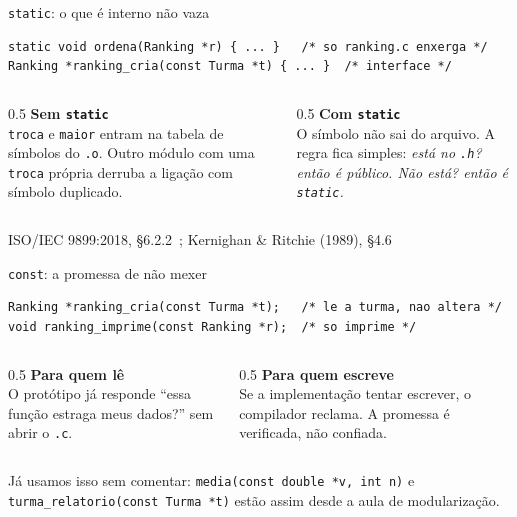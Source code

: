 \documentclass[aspectratio=169]{beamer}
\newcommand{\fonte}[1]{\vfill\hfill{\scriptsize\textcolor{UFSGray}{#1}}}
\begin{document}
\begin{frame}[fragile]{\texttt{static}: o que é interno não vaza}
\begin{lstlisting}[style=tinyC]
static void ordena(Ranking *r) { ... }   /* so ranking.c enxerga */
Ranking *ranking_cria(const Turma *t) { ... }  /* interface */
\end{lstlisting}
  \begin{columns}[T]
    \begin{column}{0.5\textwidth}
      \small \textbf{Sem \texttt{static}}\\
      \texttt{troca} e \texttt{maior} entram na tabela de símbolos do
      \texttt{.o}. Outro módulo com uma \texttt{troca} própria derruba a
      ligação com símbolo duplicado.
    \end{column}
    \begin{column}{0.5\textwidth}
      \small \textbf{Com \texttt{static}}\\
      O símbolo não sai do arquivo. A regra fica simples: \emph{está no
      \texttt{.h}? então é público. Não está? então é \texttt{static}.}
    \end{column}
  \end{columns}
  \fonte{ISO/IEC 9899:2018, §6.2.2~\cite{iso2018c17}; Kernighan \& Ritchie (1989), §4.6~\cite{kernighan1989c}}
\end{frame}

\begin{frame}[fragile]{\texttt{const}: a promessa de não mexer}
\begin{lstlisting}[style=tinyC]
Ranking *ranking_cria(const Turma *t);   /* le a turma, nao altera */
void ranking_imprime(const Ranking *r);  /* so imprime */
\end{lstlisting}
  \begin{columns}[T]
    \begin{column}{0.5\textwidth}
      \small \textbf{Para quem lê}\\
      O protótipo já responde ``essa função estraga meus dados?'' sem abrir
      o \texttt{.c}.
    \end{column}
    \begin{column}{0.5\textwidth}
      \small \textbf{Para quem escreve}\\
      Se a implementação tentar escrever, o compilador reclama. A promessa
      é verificada, não confiada.
    \end{column}
  \end{columns}
  \begin{block}{}
    \small Já usamos isso sem comentar: \texttt{media(const double *v, int n)}
    e \texttt{turma\_relatorio(const Turma *t)} estão assim desde a aula de
    modularização.
  \end{block}
\end{frame}
\end{document}
